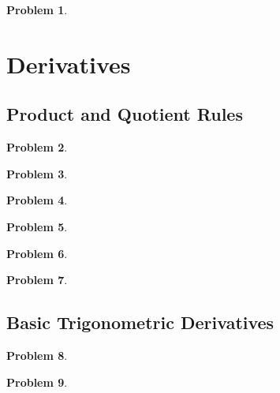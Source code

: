 \documentclass{article}
\newtheorem{problem}{Problem}
\begin{document}
\begin{problem}

\end{problem}



\section{Derivatives}
\subsection{Product and Quotient Rules}
\begin{problem}

\end{problem}

\begin{problem}

\end{problem}


\begin{problem}

\end{problem}

\begin{problem}

\end{problem}


\begin{problem}

\end{problem}


\begin{problem}

\end{problem}

\subsection{Basic Trigonometric Derivatives}
\begin{problem}

\end{problem}
\begin{problem}

\end{problem}
\end{document}
